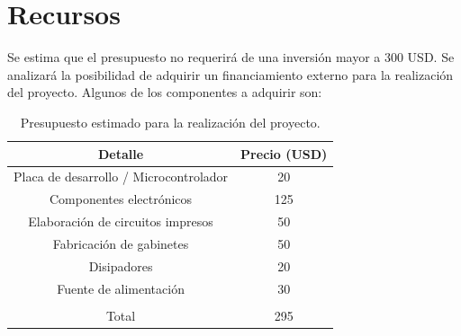 \section*{Recursos}
\justifying

Se estima que el presupuesto no requerirá de una inversión mayor a 300 USD. Se
analizará la posibilidad de adquirir un financiamiento externo para la realización del proyecto.
Algunos de los componentes a adquirir son:

\begin{table}[H]
    \centering
    \begin{tabular}{|c|c|}
        \hline
        \textbf{Detalle}                       & \textbf{Precio (USD)} \\ \hline
        Placa de desarrollo / Microcontrolador & 20                    \\ \hline
        Componentes electrónicos               & 125                   \\ \hline
        Elaboración de circuitos impresos      & 50                    \\ \hline
        Fabricación de gabinetes               & 50                    \\ \hline
        Disipadores                            & 20                    \\ \hline
        Fuente de alimentación                 & 30                    \\ \hline
                                               &                       \\ \hline
        Total                                  & 295                   \\ \hline
    \end{tabular}
    \label{tab:recursos}
    \vspace*{-0.1cm}
    \caption{Presupuesto estimado para la realización del proyecto.}
\end{table}